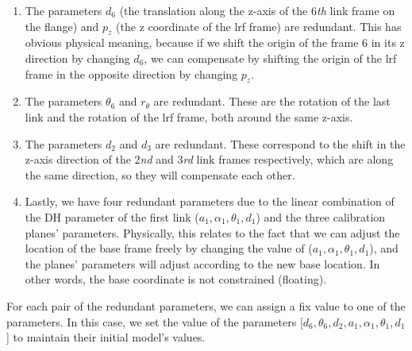 \begin{enumerate}
\item The parameters $d_6$ (the translation along the z-axis of the 6\textit{th} link frame on the flange) and $p_z$ (the z coordinate of the \ac{lrf} frame) are redundant. This has obvious physical meaning, because if we shift the origin of the frame 6 in its z direction by changing $d_6$, we can compensate by shifting the origin of the \ac{lrf} frame in the opposite direction by changing $p_z$.
\item The parameters $\theta_6$ and $r_\theta$ are redundant. These are the rotation of the last link and the rotation of the \ac{lrf} frame, both around the same z-axis. 
\item The parameters $d_2$ and $d_3$ are redundant. These correspond to the shift in the z-axis direction of the 2\textit{nd} and 3\textit{rd} link frames respectively, which are along the same direction, so they will compensate each other. 
\item Lastly, we have four redundant parameters due to the linear combination of the DH parameter of the first link ($a_1, \alpha_1, \theta_1, d_1$) and the three calibration planes' parameters. Physically, this relates to the fact that we can adjust the location of the base frame freely by changing the value of ($a_1, \alpha_1, \theta_1, d_1$), and the planes' parameters will adjust according to the new base location. In other words, the base coordinate is not constrained (floating). 
\end{enumerate}

For each pair of the redundant parameters, we can assign a fix value to one of the parameters. In this case, we set the value of the parameters [$d_6, \theta_6, d_2, a_1, \alpha_1, \theta_1, d_1$] to maintain their initial model's values. 
